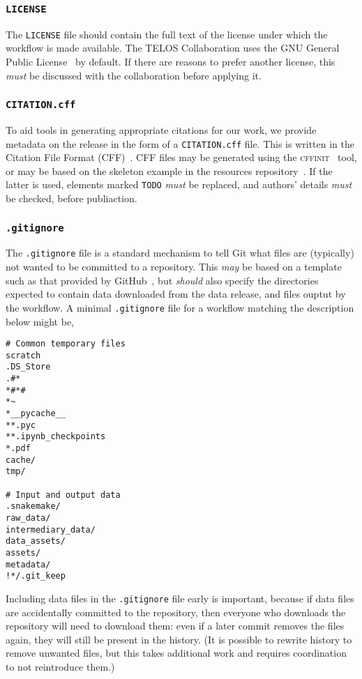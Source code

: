 \documentclass{article}
\newcommand\rfcword[1]{\emph{#1}\xspace}
\newcommand\must{\rfcword{must}}
\newcommand\should{\rfcword{should}}
\newcommand\may{\rfcword{may}}
\newcommand\filename[1]{\texttt{#1}\xspace}
\newcommand\program[1]{\textsc{#1}\xspace}
\begin{document}
\subsubsection{\filename{LICENSE}}

The \filename{LICENSE} file should contain
the full text of the license under which the workflow is made available.
The TELOS Collaboration uses the GNU General Public License~\cite{gpl} by default.
If there are reasons to prefer another license,
this \must be discussed with the collaboration before applying it.

\subsubsection{\filename{CITATION.cff}}

To aid tools in generating appropriate citations for our work,
we provide metadata on the release in the form of a \filename{CITATION.cff} file.
This is written in the Citation File Format (CFF)~\cite{cff}.
CFF files may be generated using the \program{cffinit}~\cite{cffinit} tool,
or may be based on the skeleton example in the resources repository~\cite{resources}.
If the latter is used,
elements marked \verb|TODO| \must be replaced,
and authors' details \must be checked,
before publiaction.

\subsubsection{\filename{.gitignore}}

The \filename{.gitignore} file is a standard mechanism to tell Git
what files are
(typically)
not wanted to be committed to a repository.
This \may be based on a template such as that provided by GitHub~\cite{gitignore-python},
but \should also specify the directories expected to contain
data downloaded from the data release,
and files ouptut by the workflow.
A minimal \filename{.gitignore} file for a workflow matching the description below might be,

\begin{verbatim}
# Common temporary files
scratch
.DS_Store
.#*
*#*#
*~
*__pycache__
**.pyc
**.ipynb_checkpoints
*.pdf
cache/
tmp/

# Input and output data
.snakemake/
raw_data/
intermediary_data/
data_assets/
assets/
metadata/
!*/.git_keep
\end{verbatim}

Including data files in the \filename{.gitignore} file early is important,
because if data files are accidentally committed to the repository,
then everyone who downloads the repository will need to download them:
even if a later commit removes the files again,
they will still be present in the history.
(It is possible to rewrite history to remove unwanted files,
but this takes additional work and requires coordination to not reintroduce them.)
\end{document}
